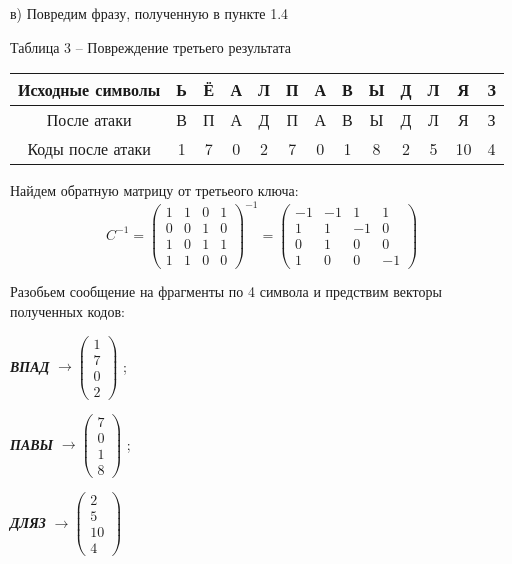 \documentclass[a5paper, 10pt]{article}
\theoremstyle{definition}
\theoremstyle{plain}
\theoremstyle{remark}
\begin{document}
 в) Повредим фразу, полученную в пункте 1.4
\begin{center}
Таблица 3 -- Повреждение третьего результата\\
\begin{tabular}{ |c|c|c|c|c|c|c|c|c|c|c|c|c| } 
 \hline
Исходные символы & Ь & Ё & А & Л & П  & А & В  & Ы & Д  & Л & Я  & З\\
\hline
После атаки & В & П & А & Д & П  & А & В  & Ы & Д  & Л & Я  & З\\
 \hline
Коды после атаки & 1 & 7 & 0 & 2 & 7  & 0 & 1  & 8 & 2  & 5 & 10  & 4  \\
 \hline
\end{tabular}
\end{center}
Найдем обратную матрицу от третьеого ключа:
\begin{equation}
C^{-1} = 
\begin{pmatrix}
1 & 1 & 0 & 1\\
0 & 0 & 1 & 0 \\
1 & 0 & 1 & 1 \\
1 & 1 & 0 & 0
\end{pmatrix}^{-1}
=  \begin{pmatrix}
-1 & -1 & 1 & 1\\
1 & 1 & -1 & 0 \\
0 & 1 & 0 & 0 \\
1 & 0 & 0 & -1
\end{pmatrix}
\end{equation}

Разобьем сообщение на фрагменты по 4 символа и предствим векторы полученных кодов:
\begin{center}
\textbf{\textit{ВПАД}} $\to \begin{pmatrix}
1\\
7\\
0\\
2
\end{pmatrix}$ ;

\textbf{\textit{ПАВЫ}}  $\to \begin{pmatrix}
7\\
0\\
1\\
8
\end{pmatrix}$ ;

\textbf{\textit{ДЛЯЗ}}  $\to \begin{pmatrix}
2\\
5\\
10\\
4
\end{pmatrix}$ \\
\end{center}
\end{document}

